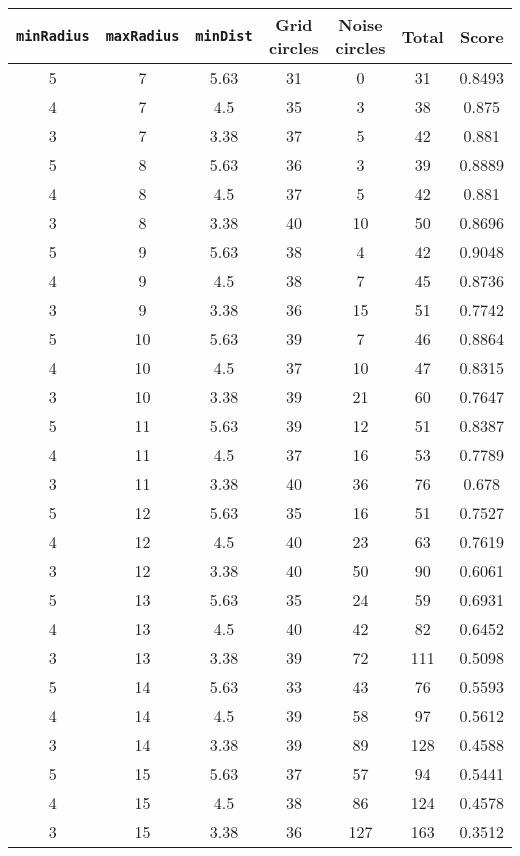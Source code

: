 \documentclass[letterpaper, 12pt]{article}
\begin{document}
\begin{longtable}{|c|c|c|c|c|c|c|}
\hline
\textbf{\texttt{minRadius}} & \textbf{\texttt{maxRadius}} & \textbf{\texttt{minDist}} & \textbf{Grid circles} & \textbf{Noise circles} & \textbf{Total} & \textbf{Score} \\
\hline
5 & 7 & 5.63 & 31 & 0 & 31 & 0.8493 \\
\hline
4 & 7 & 4.5 & 35 & 3 & 38 & 0.875 \\
\hline
3 & 7 & 3.38 & 37 & 5 & 42 & 0.881 \\
\hline
5 & 8 & 5.63 & 36 & 3 & 39 & 0.8889 \\
\hline
4 & 8 & 4.5 & 37 & 5 & 42 & 0.881 \\
\hline
3 & 8 & 3.38 & 40 & 10 & 50 & 0.8696 \\
\hline
5 & 9 & 5.63 & 38 & 4 & 42 & 0.9048 \\
\hline
4 & 9 & 4.5 & 38 & 7 & 45 & 0.8736 \\
\hline
3 & 9 & 3.38 & 36 & 15 & 51 & 0.7742 \\
\hline
5 & 10 & 5.63 & 39 & 7 & 46 & 0.8864 \\
\hline
4 & 10 & 4.5 & 37 & 10 & 47 & 0.8315 \\
\hline
3 & 10 & 3.38 & 39 & 21 & 60 & 0.7647 \\
\hline
5 & 11 & 5.63 & 39 & 12 & 51 & 0.8387 \\
\hline
4 & 11 & 4.5 & 37 & 16 & 53 & 0.7789 \\
\hline
3 & 11 & 3.38 & 40 & 36 & 76 & 0.678 \\
\hline
5 & 12 & 5.63 & 35 & 16 & 51 & 0.7527 \\
\hline
4 & 12 & 4.5 & 40 & 23 & 63 & 0.7619 \\
\hline
3 & 12 & 3.38 & 40 & 50 & 90 & 0.6061 \\
\hline
5 & 13 & 5.63 & 35 & 24 & 59 & 0.6931 \\
\hline
4 & 13 & 4.5 & 40 & 42 & 82 & 0.6452 \\
\hline
3 & 13 & 3.38 & 39 & 72 & 111 & 0.5098 \\
\hline
5 & 14 & 5.63 & 33 & 43 & 76 & 0.5593 \\
\hline
4 & 14 & 4.5 & 39 & 58 & 97 & 0.5612 \\
\hline
3 & 14 & 3.38 & 39 & 89 & 128 & 0.4588 \\
\hline
5 & 15 & 5.63 & 37 & 57 & 94 & 0.5441 \\
\hline
4 & 15 & 4.5 & 38 & 86 & 124 & 0.4578 \\
\hline
3 & 15 & 3.38 & 36 & 127 & 163 & 0.3512 \\

\end{longtable}
\end{document}
